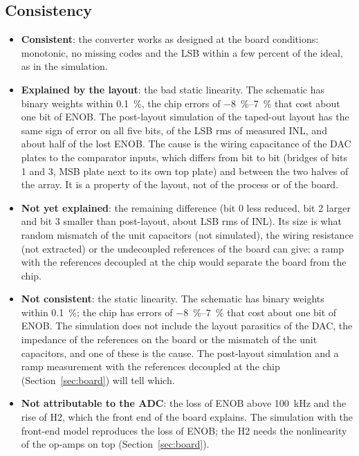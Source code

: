 \subsection{Consistency}
\begin{itemize}
  \item \textbf{Consistent}: the converter works as designed at the board conditions: monotonic, no
        missing codes and the LSB within a few percent of the ideal, as in the simulation.
\ifdefined\PexBitEA
  \item \textbf{Explained by the layout}: the bad static linearity. The schematic has binary weights
        within \SI{0.1}{\percent}, the chip errors of \SIrange{-8}{7}{\percent} that cost about one bit of
        ENOB. The post-layout simulation of the taped-out layout has the same sign of error on all five
        bits, \PexInlRms{} of the \InlRms{} LSB rms of measured INL, and about half of the lost ENOB.
        The cause is the wiring capacitance of the DAC plates to the comparator inputs, which differs
        from bit to bit (bridges of bits 1 and 3, MSB plate next to its own top plate) and between the
        two halves of the array. It is a property of the layout, not of the process or of the board.
  \item \textbf{Not yet explained}: the remaining difference (bit 0 less reduced, bit 2 larger and
        bit 3 smaller than post-layout, about \PexCmpInlRms{} LSB rms of INL). Its size is what random
        mismatch of the unit capacitors (not simulated), the wiring resistance (not extracted) or the
        undecoupled references of the board can give; a ramp with the references decoupled at the chip
        would separate the board from the chip.
\else
  \item \textbf{Not consistent}: the static linearity. The schematic has binary weights within
        \SI{0.1}{\percent}; the chip has errors of \SIrange{-8}{7}{\percent} that cost about one bit of
        ENOB. The simulation does not include the layout parasitics of the DAC, the impedance of the
        references on the board or the mismatch of the unit capacitors, and one of these is the cause.
        The post-layout simulation and a ramp measurement with the references decoupled at the chip
        (Section~\ref{sec:board}) will tell which.
\fi
  \item \textbf{Not attributable to the ADC}: the loss of ENOB above \SI{100}{kHz} and the rise of H2,
        which the front end of the board explains. The simulation with the front-end model reproduces
        the loss of ENOB; the H2 needs the nonlinearity of the op-amps on top
        (Section~\ref{sec:board}).
\end{itemize}
